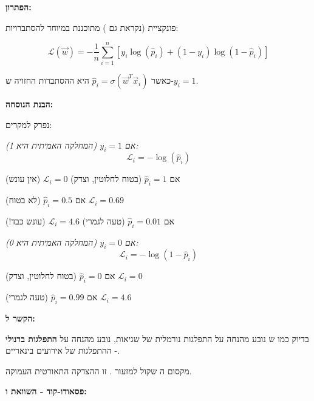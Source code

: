 \textbf{הפתרון: }

פונקציית  (נקראת גם ) מתוכננת במיוחד להסתברויות:

\begin{equation}
\mathcal{L}(\vec{w}) = -\frac{1}{n}\sum_{i=1}^{n}\left[y_i\log(\hat{p}_i) + (1-y_i)\log(1-\hat{p}_i)\right]
\end{equation}

כאשר $\hat{p}_i = \sigma(\vec{w}^T\vec{x}_i)$ היא ההסתברות החזויה ש-$y_i = 1$.

\textbf{הבנת הנוסחה:}

נפרק למקרים:

\textit{אם $y_i = 1$ (המחלקה האמיתית היא \num{1}):}
\begin{equation}
\mathcal{L}_i = -\log(\hat{p}_i)
\end{equation}

אם $\hat{p}_i = 1$ (בטוח לחלוטין, וצדק) \rarrow{} $\mathcal{L}_i = 0$ (אין עונש)

אם $\hat{p}_i = 0.5$ (לא בטוח) \rarrow{} $\mathcal{L}_i = 0.69$

אם $\hat{p}_i = 0.01$ (טעה לגמרי) \rarrow{} $\mathcal{L}_i = 4.6$ (עונש כבד!)

\textit{אם $y_i = 0$ (המחלקה האמיתית היא \num{0}):}
\begin{equation}
\mathcal{L}_i = -\log(1-\hat{p}_i)
\end{equation}

אם $\hat{p}_i = 0$ (בטוח לחלוטין, וצדק) \rarrow{} $\mathcal{L}_i = 0$

אם $\hat{p}_i = 0.99$ (טעה לגמרי) \rarrow{} $\mathcal{L}_i = 4.6$

\textbf{הקשר ל:}

בדיוק כמו ש נובע מהנחה על התפלגות נורמלית של שגיאות,  נובע מהנחה על \textbf{התפלגות ברנולי}  - ההתפלגות של אירועים בינאריים.

מקסום ה שקול למזעור . זו ההצדקה התאורטית העמוקה.

\textbf{פסאודו-קוד - השוואת  ו:}


